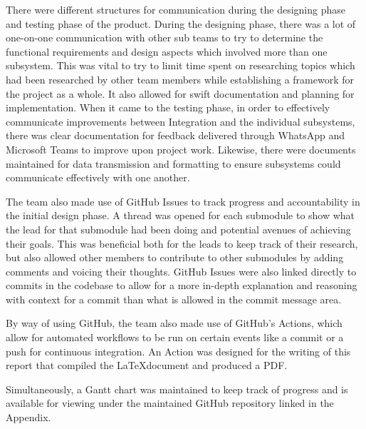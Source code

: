 \documentclass[a4paper]{article}
\begin{document}
There were different structures for communication during the designing phase 
and testing phase of the product. During the designing phase, there was a lot 
of one-on-one communication with other sub teams to try to determine the functional 
requirements and design aspects which involved more than one subsystem. This 
was vital to try to limit time spent on researching topics which had been 
researched by other team members while establishing a framework for the project 
as a whole. It also allowed for swift documentation and planning for 
implementation. When it came to the testing phase, in order to effectively 
communicate improvements between Integration and the individual subsystems, 
there was clear documentation for feedback delivered through WhatsApp and 
Microsoft Teams to improve upon project work. Likewise, there were documents 
maintained for data transmission and formatting to ensure subsystems could 
communicate effectively with one another.

The team also made use of GitHub Issues to track progress and accountability in 
the initial design phase. A thread was opened for each submodule to show what 
the lead for that submodule had been doing and potential avenues of achieving 
their goals. This was beneficial both for the leads to keep track of their 
research, but also allowed other members to contribute to other submodules 
by adding comments and voicing their thoughts. GitHub Issues were also linked 
directly to commits in the codebase to allow for a more in-depth explanation and
reasoning with context for a commit than what is allowed in the commit message 
area. 

By way of using GitHub, the team also made use of GitHub's Actions, which allow 
for automated workflows to be run on certain events like a commit or a push for 
continuous integration. An Action was designed for the writing of this report
that compiled the \LaTeX document and produced a PDF. 

Simultaneously, a Gantt chart was maintained to keep track of progress and is 
available for viewing under the maintained GitHub repository linked in the Appendix.

\end{document}
